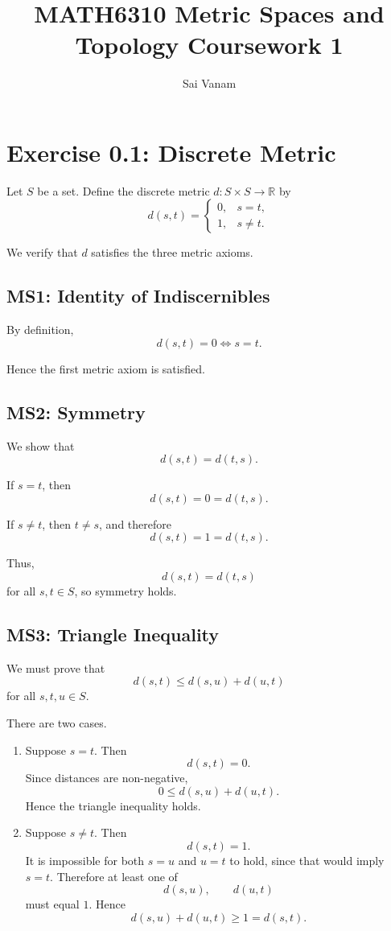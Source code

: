 \documentclass[12pt]{article}
\title{\textbf{MATH6310 Metric Spaces and Topology Coursework 1}}
\author{Sai Vanam}
\date{}
\begin{document}
\maketitle

\section*{Exercise 0.1: Discrete Metric}

Let \(S\) be a set. Define the discrete metric \(d:S\times S\to \mathbb{R}\) by
\[
d(s,t)=
\begin{cases}
0, & s=t,\\
1, & s\neq t.
\end{cases}
\]

We verify that \(d\) satisfies the three metric axioms.

\subsection*{MS1: Identity of Indiscernibles}

By definition,
\[
d(s,t)=0 \iff s=t.
\]

Hence the first metric axiom is satisfied.

\subsection*{MS2: Symmetry}

We show that
\[
d(s,t)=d(t,s).
\]

If \(s=t\), then
\[
d(s,t)=0=d(t,s).
\]

If \(s\neq t\), then \(t\neq s\), and therefore
\[
d(s,t)=1=d(t,s).
\]

Thus,
\[
\boxed{d(s,t)=d(t,s)}
\]
for all \(s,t\in S\), so symmetry holds.

\subsection*{MS3: Triangle Inequality}

We must prove that
\[
d(s,t)\leq d(s,u)+d(u,t)
\]
for all \(s,t,u\in S\).

There are two cases.

\begin{enumerate}[label=\textbf{Case \arabic*:}]
    \item Suppose \(s=t\). Then
    \[
    d(s,t)=0.
    \]
    Since distances are non-negative,
    \[
    0\leq d(s,u)+d(u,t).
    \]
    Hence the triangle inequality holds.

    \item Suppose \(s\neq t\). Then
    \[
    d(s,t)=1.
    \]
    It is impossible for both \(s=u\) and \(u=t\) to hold, since that would imply \(s=t\). Therefore at least one of
    \[
    d(s,u), \qquad d(u,t)
    \]
    must equal \(1\). Hence
    \[
    d(s,u)+d(u,t)\geq 1=d(s,t).
    \]
\end{enumerate}
\end{document}

